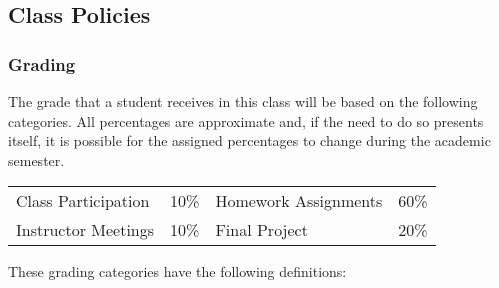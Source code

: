 \subsection*{Class Policies}

\subsubsection*{Grading}

The grade that a student receives in this class will be based on the following categories. All percentages are
approximate and, if the need to do so presents itself, it is possible for the assigned percentages to change during the
academic semester. 

\begin{center}
\begin{tabular}{llll}
Class Participation & 10\% & Homework Assignments & 60\% \\
Instructor Meetings & 10\% & Final Project & 20\%
\end{tabular}
\end{center}

\vspace*{-.1in}
\noindent
These grading categories have the following definitions:
\vspace*{-.1in}


